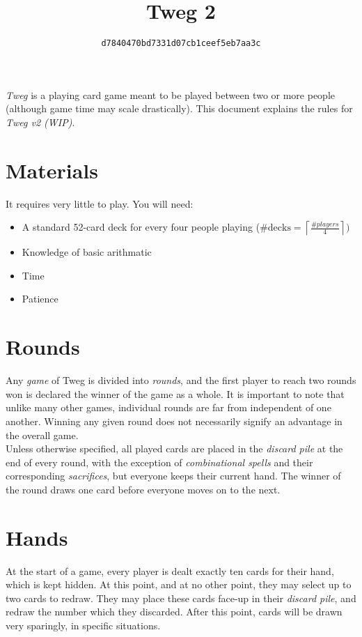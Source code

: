 \documentclass[letterpaper, reqno, 11pt]{article}
\newcommand{\ttitle}{Tweg 2}
\newcommand{\tname}{\texttt{d7840470bd7331d07cb1ceef5eb7aa3c}}
\begin{document}
\title{\ttitle}
\author{\tname}

\maketitle

\textit{Tweg} is a playing card game meant to be played between two or more people (although game time may scale drastically). This document explains the rules for \textit{Tweg v2 (WIP)}.

\section*{Materials}
It requires very little to play. You will need:
\begin{itemize}
\item A standard 52-card deck for every four people playing ($\#\text{decks}=\left\lceil\frac{\#players}{4}\right\rceil)$
\item Knowledge of basic arithmatic
\item Time
\item Patience
\end{itemize}

\section*{Rounds}
\indent Any \textit{game} of Tweg is divided into \textit{rounds}, and the first player to reach two rounds won is declared the winner of the game as a whole. It is important to note that unlike many other games, individual rounds are far from independent of one another. Winning any given round does not necessarily signify an advantage in the overall game.\\
\indent Unless otherwise specified, all played cards are placed in the \textit{discard pile} at the end of every round, with the exception of \textit{combinational spells} and their corresponding \textit{sacrifices}, but everyone keeps their current hand. The winner of the round draws one card before everyone moves on to the next.

\section*{Hands}
\indent At the start of a game, every player is dealt exactly ten cards for their hand, which is kept hidden. At this point, and at no other point, they may select up to two cards to redraw. They may place these cards face-up in their \textit{discard pile}, and redraw the number which they discarded. After this point, cards will be drawn very sparingly, in specific situations.
\end{document}
